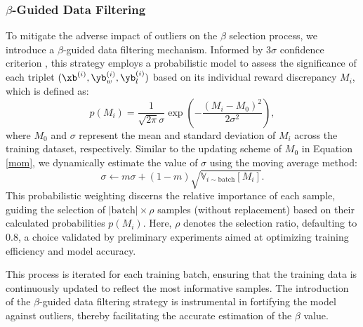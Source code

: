 \subsubsection{$\beta$-Guided Data Filtering }
To mitigate the adverse impact of outliers on the $\beta$ selection process, we introduce a $\beta$-guided data filtering mechanism. Informed by $3\sigma$ confidence criterion \cite{3sigma}, this strategy employs a probabilistic model to assess the significance of each triplet $(\xb^{(i)}, \yb_w^{(i)}, \yb_l^{(i)})$ based on its individual reward discrepancy $M_i$, which is defined as:
\begin{equation}
    p(M_i) = \frac{1}{\sqrt{2\pi}\sigma} \exp\left(-\frac{(M_i-M_0)^2}{2\sigma^2}\right),
    \label{sampling_p}
\end{equation}
where $M_0$ and $\sigma$ represent the mean and standard deviation of $M_i$ across the training dataset, respectively.
Similar to the updating scheme of $M_0$ in Equation \eqref{mom}, we dynamically estimate the value of $\sigma$ using the moving average method:
\begin{equation}
     \sigma \leftarrow m \sigma + (1-m)  \sqrt{\mathbb{V}_{i \sim\text{batch}}[M_i]}.
     \label{mom2}
\end{equation}
This probabilistic weighting discerns the relative importance of each sample, guiding the selection of $|\text{batch}| \times \rho$ samples (without replacement) based on their calculated probabilities $p(M_i)$. Here, $\rho$ denotes the selection ratio, defaulting to 0.8, a choice validated by preliminary experiments aimed at optimizing training efficiency and model accuracy.

This process is iterated for each training batch, ensuring that the training data is continuously updated to reflect the most informative samples. The introduction of the $\beta$-guided data filtering strategy is instrumental in fortifying the model against outliers, thereby facilitating the accurate estimation of the $\beta$ value.

